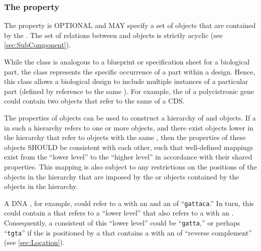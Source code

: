 \subsubsection*{The  property}
\label{sec:components}

The  property is OPTIONAL and MAY specify a set of  objects that are contained by the . The set of relations between  and  objects is strictly acyclic (see \ref{sec:SubComponent}).

While the  class is analogous to a blueprint or specification sheet for a biological part, the  class represents the specific occurrence of a part within a design.
Hence, this class allows a biological design to include multiple instances of a particular part (defined by reference to the same ). For example, the  of a polycistronic gene could contain two  objects that refer to the same  of a CDS.

The  properties of  objects can be used to construct a hierarchy of  and  objects. 
If a  in such a hierarchy refers to one or more  objects, and there exist  objects lower in the hierarchy that refer to  objects with the same , then the  properties of these  objects SHOULD be consistent with each other, such that well-defined mappings exist from the ``lower level''  to the ``higher level''  in accordance with their shared  properties. 
This mapping is also subject to any restrictions on the positions of the  objects in the hierarchy that are imposed by the  or  objects contained by the  objects in the hierarchy.

A DNA , for example, could refer to a  with an   and an   of ``{\tt gattaca}.'' In turn, this  could contain a  that refers to a ``lower level''   that also refers to a  with an  . Consequently, a consistent   of this ``lower level''  could be ``{\tt gatta},'' or perhaps ``{\tt tgta}'' if the  is positioned by a  that contains a   with an  of ``reverse complement'' (see \ref{sec:Location}).


